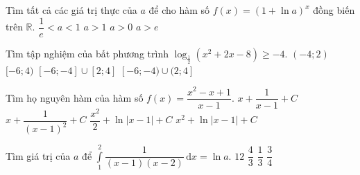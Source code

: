 \begin{ex}%
	Tìm tất cả các giá trị thực của $a$ để cho hàm số $f(x)=(1+ \ln a)^x$ đồng biến trên $\mathbb{R}$.
	\choice
	{$\dfrac{1}{e} < a < 1$}
	{\True $a>1$}
	{$a>0$}
	{$a>e$}
\end{ex}
\begin{ex}%
	Tìm tập nghiệm của bất phương trình 
	$\log_{\frac{1}{2}} (x^2+2x-8) \ge -4$.
	\choice
	{$(-4; 2)$}
	{$[-6; 4)$}
	{$[-6; -4] \cup [2; 4]$}
	{\True $[-6; -4) \cup (2; 4]$}
\end{ex}
\begin{ex}%
	Tìm họ nguyên hàm của hàm số $f(x)= \dfrac{x^2 -x +1}{x-1}$.
	\choice
	{$x + \dfrac{1}{x-1} + C$}
	{$x + \dfrac{1}{(x-1)^2} + C$}
	{\True $\dfrac{x^2}{2} + \ln \vert x-1 \vert + C$}
	{$x^2 + \ln \vert x-1 \vert + C$}
\end{ex}
\begin{ex}%
	Tìm giá trị của $a$ để $\displaystyle \int \limits_1^2\dfrac{1}{(x-1)(x-2)} \mathrm{\,d}x = \ln a$.
	\choice
	{$12$}
	{\True $ \dfrac{4}{3}$}
	{$ \dfrac{1}{3}$}
	{$ \dfrac{3}{4}$}
\end{ex}
